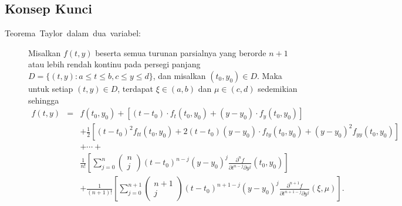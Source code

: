 \subsection{Konsep Kunci}
\begin{description}
\item [{Teorema~Taylor~dalam~dua~variabel:}] Misalkan
$f(t,y)$ beserta semua turunan parsialnya yang berorde $n+1$ atau
lebih rendah kontinu pada persegi panjang $D=\{(t,y):a\leq t\leq b,c\leq y\leq d\}$,
dan misalkan $(t_{0},y_{0})\in D$. Maka untuk setiap $(t,y)\in D$,
terdapat $\xi\in(a,b)$ dan $\mu\in(c,d)$ sedemikian sehingga 
\begin{eqnarray*}
f(t,y) & = & f(t_{0},y_{0})+\left[(t-t_{0})\cdot f_{t}(t_{0},y_{0})+(y-y_{0})\cdot f_{y}(t_{0},y_{0})\right]\\
 &  & +\frac{1}{2}\left[(t-t_{0})^{2}f_{tt}(t_{0},y_{0})+2(t-t_{0})(y-y_{0})\cdot f_{ty}(t_{0},y_{0})+(y-y_{0})^{2}f_{yy}(t_{0},y_{0})\right]\\
 &  & +\cdots+\\
 &  & \frac{1}{n!}\left[\sum_{j=0}^{n}\left(\begin{array}{c}
n\\
j
\end{array}\right)(t-t_{0})^{n-j}(y-y_{0})^{j}\frac{\partial^{n}f}{\partial t^{n-j}\partial y^{j}}(t_{0},y_{0})\right]\\
 &  & +\frac{1}{(n+1)!}\left[\sum_{j=0}^{n+1}\left(\begin{array}{c}
n+1\\
j
\end{array}\right)(t-t_{0})^{n+1-j}(y-y_{0})^{j}\frac{\partial^{n+1}f}{\partial t^{n+1-j}\partial y^{j}}(\xi,\mu)\right].
\end{eqnarray*}
\end{description}
\noindent\startexercises 


